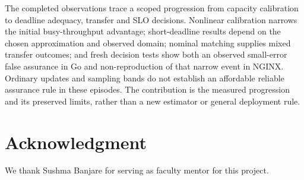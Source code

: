 \documentclass[10pt,a4paper]{article}
\begin{document}
The completed observations trace a scoped progression from capacity calibration to deadline adequacy, transfer and SLO decisions. Nonlinear calibration narrows the initial busy-throughput advantage; short-deadline results depend on the chosen approximation and observed domain; nominal matching supplies mixed transfer outcomes; and fresh decision tests show both an observed small-error false assurance in Go and non-reproduction of that narrow event in NGINX. Ordinary updates and sampling bands do not establish an affordable reliable assurance rule in these episodes. The contribution is the measured progression and its preserved limits, rather than a new estimator or general deployment rule.

\FloatBarrier

\section*{Acknowledgment}

We thank Sushma Banjare for serving as faculty mentor for this project.
\end{document}

